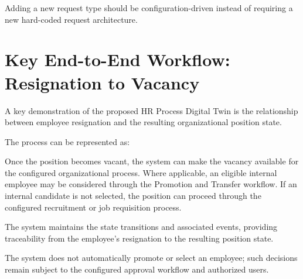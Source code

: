 \documentclass[12pt,a4paper]{article}
\begin{document}
Adding a new request type should be configuration-driven instead of
requiring a new hard-coded request architecture.

\section{Key End-to-End Workflow: Resignation to Vacancy}

A key demonstration of the proposed HR Process Digital Twin is the
relationship between employee resignation and the resulting
organizational position state.

The process can be represented as:

\begin{center}
\end{center}

Once the position becomes vacant, the system can make the vacancy
available for the configured organizational process. Where
applicable, an eligible internal employee may be considered through
the Promotion and Transfer workflow. If an internal candidate is
not selected, the position can proceed through the configured
recruitment or job requisition process.

The system maintains the state transitions and associated events,
providing traceability from the employee's resignation to the
resulting position state.

The system does not automatically promote or select an employee;
such decisions remain subject to the configured approval workflow
and authorized users.
\end{document}
